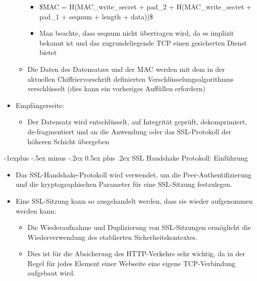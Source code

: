 \documentclass[a4paper]{article}
\makeatletter
\renewcommand{\subsection}{\@startsection{subsection}{2}{0mm}%
 {-1explus -.5ex minus -.2ex}%
 {0.5ex plus .2ex}%
 {\normalfont\normalsize\bfseries}}
\makeatother
\begin{document}
\begin{multicols}{3}
\begin{itemize}
\begin{itemize}
                        \begin{itemize}
                            \item
                                  \$MAC = H(MAC\_write\_secret + pad\_2 + H(MAC\_write\_secret +
                                  pad\_1 + seqnum + length + data))\$
                            \item
                                  Man beachte, dass seqnum nicht übertragen wird, da es implizit
                                  bekannt ist und das zugrundeliegende TCP einen gesicherten Dienst
                                  bietet
                        \end{itemize}
                  \item
                        Die Daten des Datensatzes und der MAC werden mit dem in der
                        aktuellen Chiffriervorschrift definierten
                        Verschlüsselungsalgorithmus verschlüsselt (dies kann ein vorheriges
                        Auffüllen erfordern)
              \end{itemize}
        \item
              Empfängerseite:

              \begin{itemize}
                  \item
                        Der Datensatz wird entschlüsselt, auf Integrität geprüft,
                        dekomprimiert, de-fragmentiert und an die Anwendung oder das
                        SSL-Protokoll der höheren Schicht übergeben
              \end{itemize}
    \end{itemize}


    \subsection{SSL Handshake Protokoll:
        Einführung}

    \begin{itemize}
        \item
              Das SSL-Handshake-Protokoll wird verwendet, um die
              Peer-Authentifizierung und die kryptographischen Parameter für eine
              SSL-Sitzung festzulegen.
        \item
              Eine SSL-Sitzung kann so ausgehandelt werden, dass sie wieder
              aufgenommen werden kann:

              \begin{itemize}
                  \item
                        Die Wiederaufnahme und Duplizierung von SSL-Sitzungen ermöglicht die
                        Wiederverwendung des etablierten Sicherheitskontextes.
                  \item
                        Dies ist für die Absicherung des HTTP-Verkehrs sehr wichtig, da in
                        der Regel für jedes Element einer Webseite eine eigene
                        TCP-Verbindung aufgebaut wird.


\end{itemize}
\end{itemize}
\end{multicols}
\end{document}
